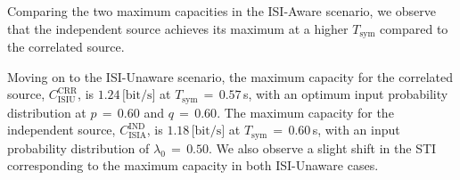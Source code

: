 \documentclass[journal]{IEEEtranTCOM}
\begin{document}
Comparing the two maximum capacities in the ISI-Aware scenario, we observe that the independent source achieves its maximum at a higher $T_{\mathrm{sym}}$ compared to the correlated source. 

Moving on to the ISI-Unaware scenario, the maximum capacity for the correlated source, $C_{\text{ISIU}}^{\text{CRR}}$, is $1.24\,\text{[bit/s]}$ at $T_{\mathrm{sym}}$$\,=\,$$0.57$\,s, with an optimum input probability distribution at $p$$\,=\,$$0.60$ and $q$$\,=\,$$0.60$. The maximum capacity for the independent source, $C_{\text{ISIA}}^{\text{IND}}$, is $1.18\,\text{[bit/s]}$ at $T_{\mathrm{sym}}$$\,=\,$$0.60$\,s, with an input probability distribution of $\lambda_{0}$$\,=\,$$0.50$. We also observe a slight shift in the STI corresponding to the maximum capacity in both ISI-Unaware cases.
\end{document}

